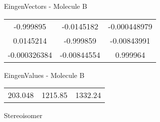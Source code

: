 \begin{multicols}{2}
\begin{center}
\vtab
 EingenVectors - Molecule B     \\
\vtab
\begin{tabular}{|c c c|}
-0.999895	 & 	-0.0145182	 & 	-0.000448979	 \\
0.0145214	 & 	-0.999859	 & 	-0.00843991	 \\
-0.000326384	 & 	-0.00844554	 & 	0.999964
\end{tabular}

\vtab
 EingenValues - Molecule B     \\
\vtab
\begin{tabular}{|c c c|}
203.048	 & 	1215.85	 & 	1332.24	 \\
\end{tabular}

\end{center}
\end{multicols}
\begin{center}
\vtab
\vtab
\textcolor{NavyBlue}{\Large Stereoisomer}
\end{center}

 \newpage

